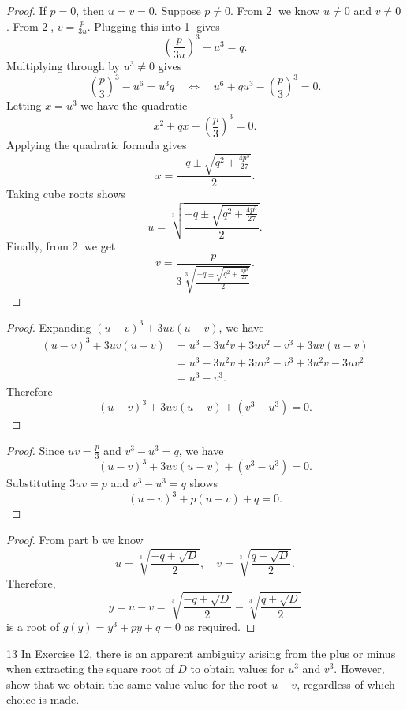 \begin{proof}
    If $p = 0$, then $u = v = 0$. Suppose $p \ne 0$. From \textcircled{2} we know $u \ne 0$ and $v \ne 0$.
    From \textcircled{2}, $v = \frac{p}{3u}$. Plugging this into \textcircled{1} gives
        \[
            \left(\frac{p}{3u}\right)^3 - u^3 = q.
        \]
    Multiplying through by $u^3 \ne 0$ gives 
        \[
            \left(\frac{p}{3}\right)^3 - u^6 = u^3 q \quad \iff \quad u^6 + q u^3 - \left(\frac{p}{3}\right)^3 = 0.
        \]
    Letting $x = u^3$ we have the quadratic
        \[
            x^2 + q x - \left(\frac{p}{3}\right)^3 = 0.
        \]
    Applying the quadratic formula gives
        \[
            x = \frac{-q \pm \sqrt{q^2 + \frac{4p^3}{27}}}{2}.
        \]
    Taking cube roots shows
        \[
            u = \sqrt[3]{\frac{-q \pm \sqrt{q^2 + \frac{4p^3}{27}}}{2}}.
        \]
    Finally, from \textcircled{2} we get
        \[
            v = \frac{p}{3 \sqrt[3]{\frac{-q \pm \sqrt{q^2 + \frac{4p^3}{27}}}{2}}}.
        \]
\end{proof}

\begin{proof}
    Expanding $(u - v)^3 + 3uv(u - v)$, we have
    \begin{align*}
        (u - v)^3 + 3uv(u - v) 
        &= u^3 - 3u^2v + 3uv^2 - v^3 + 3uv(u - v) \\
        &= u^3 - 3u^2v + 3uv^2 - v^3 + 3u^2v - 3uv^2 \\
        &= u^3 - v^3.
    \end{align*}
    Therefore
        \[
            (u - v)^3 + 3uv(u - v) + (v^3 - u^3) = 0.
        \]
\end{proof}

\begin{proof}
    Since $uv = \frac{p}{3}$ and $v^3 - u^3 = q$, we have
    \[
        (u - v)^3 + 3uv(u - v) + (v^3 - u^3) = 0.
    \]
    Substituting $3uv = p$ and $v^3 - u^3 = q$ shows
    \[
        (u - v)^3 + p(u - v) + q = 0.
    \]
\end{proof}

\begin{proof}
    From part b we know
    \[
        u = \sqrt[3]{\frac{-q + \sqrt{D}}{2}}, \quad v = \sqrt[3]{\frac{q + \sqrt{D}}{2}}.
    \]
    Therefore,
    \[
        y = u - v = \sqrt[3]{\frac{-q + \sqrt{D}}{2}} - \sqrt[3]{\frac{q + \sqrt{D}}{2}}
    \]
    is a root of $g(y) = y^3 + py + q = 0$ as required.
\end{proof}

\begin{problem}{13}
    In Exercise 12, there is an apparent ambiguity arising from the plus or minus when extracting
        the square root of $D$ to obtain values for $u^3$ and $v^3$. However, show that we obtain 
        the same value value for the root $u - v$, regardless of which choice is made.
\end{problem}
\solved

